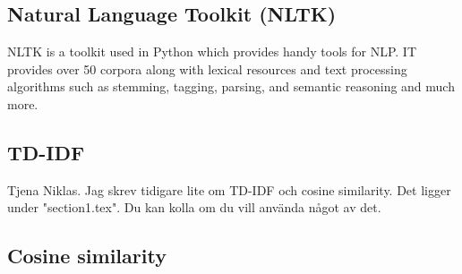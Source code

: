 \subsection{Natural Language Toolkit (NLTK)}
NLTK is a toolkit used in Python which provides handy tools for NLP. IT provides over 50 corpora along with lexical resources and text processing algorithms such as stemming, tagging, parsing, and semantic reasoning and much more.\cite{nltk_book}

\subsection{TD-IDF}
Tjena Niklas. Jag skrev tidigare lite om TD-IDF och cosine similarity. Det ligger under "section1.tex". Du kan kolla om du vill använda något av det. 
\subsection{Cosine similarity}